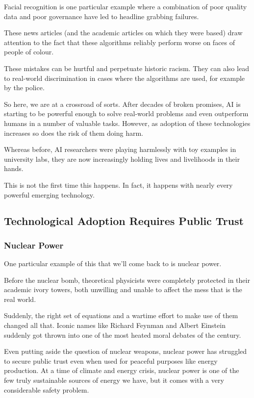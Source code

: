 \documentclass[
]{book}
\theoremstyle{definition}
\theoremstyle{definition}
\theoremstyle{definition}
\theoremstyle{definition}
\theoremstyle{remark}
\begin{document}
Facial recognition is one particular example where a combination of poor quality data and poor governance have led to headline grabbing failures.

These news articles (and the academic articles on which they were based) draw attention to the fact that these algorithms reliably perform worse on faces of people of colour.

These mistakes can be hurtful and perpetuate historic racism. They can also lead to real-world discrimination in cases where the algorithms are used, for example by the police.

So here, we are at a crossroad of sorts. After decades of broken promises,
AI is starting to be powerful enough to solve real-world problems and even outperform humans in a number of valuable tasks. However, as adoption of these technologies increases so does the risk of them doing harm.

Whereas before, AI researchers were playing harmlessly with toy examples
in university labs, they are now increasingly holding lives and livelihoods in their hands.

This is not the first time this happens. In fact, it happens with nearly
every powerful emerging technology.

\hypertarget{technological-adoption-requires-public-trust}{%
\subsection{Technological Adoption Requires Public Trust}\label{technological-adoption-requires-public-trust}}

\hypertarget{nuclear-power}{%
\subsubsection{Nuclear Power}\label{nuclear-power}}

One particular example of this that we'll come back to is nuclear power.

Before the nuclear bomb, theoretical physicists were completely
protected in their academic ivory towers, both unwilling and unable to affect
the mess that is the real world.

Suddenly, the right set of equations and a wartime effort to make use of
them changed all that. Iconic names like Richard Feynman and Albert Einstein suddenly got thrown into one of the most heated moral debates of the century.

Even putting aside the question of nuclear weapons, nuclear power has struggled to secure public trust even when used for peaceful purposes like energy production. At a time of climate and energy crisis, nuclear power is one of the few truly sustainable sources of energy we have, but it comes with a very considerable safety problem.
\end{document}
